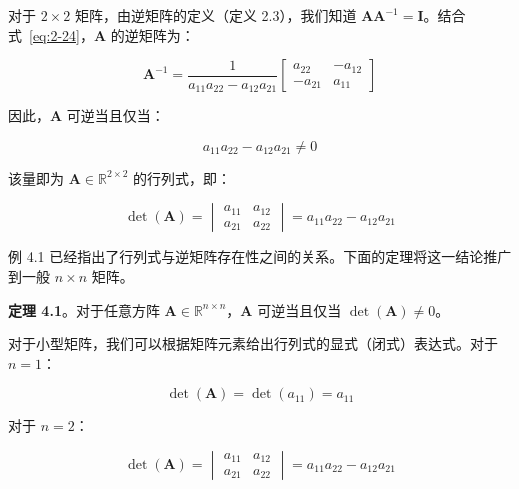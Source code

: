\begin{notebox}
对于 $ 2 \times 2 $ 矩阵，由逆矩阵的定义（定义 2.3），我们知道 $ \boldsymbol{A} \boldsymbol{A}^{-1} = \boldsymbol{I} $。结合式~\eqref{eq:2-24}，$ \boldsymbol{A} $ 的逆矩阵为：

\begin{equation}
\boldsymbol{A}^{-1} = \frac{1}{a_{11}a_{22} - a_{12}a_{21}} \begin{bmatrix} a_{22} & -a_{12} \\ -a_{21} & a_{11} \end{bmatrix}
\tag{4.2}\label{eq:4-2}
\end{equation}

因此，$ \boldsymbol{A} $ 可逆当且仅当：

\begin{equation}
a_{11}a_{22} - a_{12}a_{21} \neq 0
\tag{4.3}\label{eq:4-3}
\end{equation}

该量即为 $ \boldsymbol{A} \in \mathbb{R}^{2 \times 2} $ 的行列式，即：

\begin{equation}
\det(\boldsymbol{A}) = \begin{vmatrix} a_{11} & a_{12} \\ a_{21} & a_{22} \end{vmatrix} = a_{11}a_{22} - a_{12}a_{21}
\tag{4.4}\label{eq:4-4}
\end{equation}
\end{notebox}

例 4.1 已经指出了行列式与逆矩阵存在性之间的关系。下面的定理将这一结论推广到一般 $ n \times n $ 矩阵。

\textbf{定理 4.1}。对于任意方阵 $ \boldsymbol{A} \in \mathbb{R}^{n \times n} $，$ \boldsymbol{A} $ 可逆当且仅当 $ \det(\boldsymbol{A}) \neq 0 $。

对于小型矩阵，我们可以根据矩阵元素给出行列式的显式（闭式）表达式。对于 $ n = 1 $：

\begin{equation}
\det(\boldsymbol{A}) = \det(a_{11}) = a_{11}
\tag{4.5}\label{eq:4-5}
\end{equation}

对于 $ n = 2 $：

\begin{equation}
\det(\boldsymbol{A}) = \begin{vmatrix} a_{11} & a_{12} \\ a_{21} & a_{22} \end{vmatrix} = a_{11}a_{22} - a_{12}a_{21}
\tag{4.6}\label{eq:4-6}
\end{equation}

